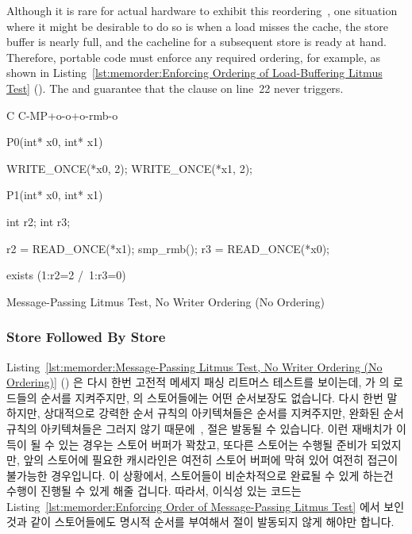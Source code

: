 Although it is rare for actual hardware to
exhibit this reordering~\cite{LucMaranget2017aarch64},
one situation where it might be desirable to do so is when a load
misses the cache, the store buffer is nearly full, and the cacheline for
a subsequent store is ready at hand.
Therefore, portable code must enforce any required ordering, for example,
as shown in
Listing~\ref{lst:memorder:Enforcing Ordering of Load-Buffering Litmus Test}
().
The  and  guarantee that
the  clause on line~22 never triggers.
\fi

\begin{listing}[tbp]
{ \scriptsize
\begin{verbbox}[\LstLineNo]
C C-MP+o-o+o-rmb-o

{
}

P0(int* x0, int* x1) {

  WRITE_ONCE(*x0, 2);
  WRITE_ONCE(*x1, 2);

}

P1(int* x0, int* x1) {

  int r2;
  int r3;

  r2 = READ_ONCE(*x1);
  smp_rmb();
  r3 = READ_ONCE(*x0);

}

exists (1:r2=2 /\ 1:r3=0)
\end{verbbox}
}
\centering
\theverbbox
\caption{Message-Passing Litmus Test, No Writer Ordering (No Ordering)}
\label{lst:memorder:Message-Passing Litmus Test, No Writer Ordering (No Ordering)}
\end{listing}

\subsubsection{Store Followed By Store}
\label{sec:memorder:Store Followed By Store}

Listing~\ref{lst:memorder:Message-Passing Litmus Test, No Writer Ordering (No Ordering)}
()
은 다시 한번 고전적 메세지 패싱 리트머스 테스트를 보이는데,  가
 의 로드들의 순서를 지켜주지만,  의 스토어들에는 어떤
순서보장도 없습니다.
다시 한번 말하지만, 상대적으로 강력한 순서 규칙의 아키텍쳐들은 순서를
지켜주지만, 완화된 순서 규칙의 아키텍쳐들은 그러지 않기
때문에~\cite{JadeAlglave2011ppcmem},  절은 발동될 수 있습니다.
이런 재배치가 이득이 될 수 있는 경우는 스토어 버퍼가 꽉찼고, 또다른 스토어는
수행될 준비가 되었지만, 앞의 스토어에 필요한 캐시라인은 여전히 스토어 버퍼에
막혀 있어 여전히 접근이 불가능한 경우입니다.
이 상황에서, 스토어들이 비순차적으로 완료될 수 있게 하는건 수행이 진행될 수
있게 해줄 겁니다.
따라서, 이식성 있는 코드는
Listing~\ref{lst:memorder:Enforcing Order of Message-Passing Litmus Test} 에서
보인 것과 같이 스토어들에도 명시적 순서를 부여해서  절이 발동되지
않게 해야만 합니다.
\iffalse

